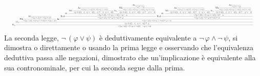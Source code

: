 \begin{example}
    \[\resizebox{0.98\linewidth}{!}{$\displaystyle\text{El}_{\bot}\frac{\displaystyle\text{El}_{\neg \,}\frac{\displaystyle \text{Wk}\frac{\displaystyle\text{Ax}\frac{}{\neg \,(\varphi\land\psi)\vdash\neg \,(\varphi\land\psi)}}{\neg \,(\varphi\land\psi),\neg \,(\neg \,\varphi\lor\neg \,\psi)\vdash\neg \,(\varphi\land\psi)} \; \text{In}_{\land}\frac{\displaystyle \text{RaA}\frac{\displaystyle\text{El}_{\neg \,}\frac{\displaystyle \text{Wk}\frac{\displaystyle\text{Ax}\frac{}{\neg \,(\neg \,\varphi\lor\neg \,\psi)\vdash\neg \,(\neg \,\varphi\lor\neg \,\psi)}}{\neg \,(\varphi\land\psi),\neg \,(\neg \,\varphi\lor\neg \,\psi),\neg \,\varphi\vdash\neg \,(\neg \,\varphi\lor\neg \,\psi)} \; \text{In}_{\lor\cdot}\frac{\displaystyle \text{Wk}\frac{\displaystyle\text{Ax}\frac{}{\neg \,\varphi\vdash\neg \,\varphi}}{\neg \,(\varphi\land\psi),\neg \,(\neg \,\varphi\lor\neg \,\psi),\neg \,\varphi\vdash\neg \,\varphi}}{\neg \,(\varphi\land\psi),\neg \,(\neg \,\varphi\lor\neg \,\psi),\neg \,\varphi\vdash\neg \,\varphi\lor\neg \,\psi}}{\neg \,(\varphi\land\psi),\neg \,(\neg \,\varphi\lor\neg \,\psi),\neg \,\varphi\vdash\bot}}{\neg \,(\varphi\land\psi),\neg \,(\neg \,\varphi\lor\neg \,\psi)\vdash\varphi} \; \text{RaA}\frac{\displaystyle\text{El}_{\neg \,}\frac{\displaystyle \text{Wk}\frac{\displaystyle\text{Ax}\frac{}{\neg \,(\neg \,\varphi\lor\neg \,\psi)\vdash\neg \,(\neg \,\varphi\lor\neg \,\psi)}}{\neg \,(\varphi\land\psi),\neg \,(\neg \,\varphi\lor\neg \,\psi),\neg \,\psi\vdash\neg \,(\neg \,\varphi\lor\neg \,\psi)} \; \text{In}_{\cdot\lor}\frac{\displaystyle \text{Wk}\frac{\displaystyle\text{Ax}\frac{}{\neg \,\psi\vdash\neg \,\psi}}{\neg \,(\varphi\land\psi),\neg \,(\neg \,\varphi\lor\neg \,\psi),\neg \,\psi\vdash\neg \,\psi}}{\neg \,(\varphi\land\psi),\neg \,(\neg \,\varphi\lor\neg \,\psi),\neg \,\psi\vdash\neg \,\varphi\lor\neg \,\psi}}{\neg \,(\varphi\land\psi),\neg \,(\neg \,\varphi\lor\neg \,\psi),\neg \,\psi\vdash\bot}}{\neg \,(\varphi\land\psi),\neg \,(\neg \,\varphi\lor\neg \,\psi)\vdash\psi}}{\neg \,(\varphi\land\psi),\neg \,(\neg \,\varphi\lor\neg \,\psi)\vdash\varphi\land\psi}}{\neg \,(\varphi\land\psi),\neg \,(\neg \,\varphi\lor\neg \,\psi)\vdash\bot}}{\neg \,(\varphi\land\psi),\neg \,(\neg \,\varphi\lor\neg \,\psi)\vdash\neg \,\varphi\lor\neg \,\psi}$}\]
    La seconda legge, $\neg \, (\varphi \lor \psi)$ è deduttivamente equivalente a $\neg \,\varphi \land \neg \,\psi$, si dimostra o direttamente o usando la prima legge e osservando che l'equivalenza deduttiva passa alle negazioni, dimostrato che un'implicazione è equivalente alla sua contronominale, per cui la seconda segue dalla prima.
\end{example}

